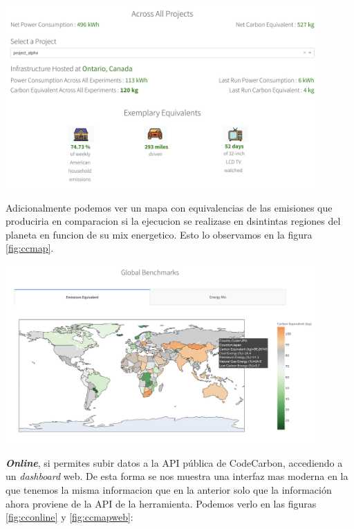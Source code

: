 \documentclass[12pt,a4paper]{report}
\begin{document}
\begin{center}
  \includegraphics[width=0.9\textwidth]{imagenes/CC_1.png}
  \label{fig:ccoffline}
\end{center}

Adicionalmente podemos ver un mapa con equivalencias de las emisiones que produciria en comparacion si 
la ejecucion se realizase en dsintintas regiones del planeta en funcion de su mix energetico. Esto lo 
observamos en la figura \ref{fig:ccmap}.

\begin{center}
  \includegraphics[width=0.9\textwidth]{imagenes/CC_2.png}
  \label{fig:ccmap}
\end{center}

\textbf{\textit{Online}}, si permites subir datos a la API pública de CodeCarbon, accediendo a un 
\textit{dashboard} web. De esta forma se nos muestra una interfaz mas moderna en la que tenemos 
la misma informacion que en la anterior solo que la información ahora proviene de la API de la herramienta. 
Podemos verlo en las figuras \ref{fig:cconline} y \ref{fig:ccmapweb}:
\end{document}
